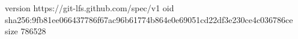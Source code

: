 version https://git-lfs.github.com/spec/v1
oid sha256:9fb81ee066437786f67ac96b61774b864e0e69051cd22df3e230ce4c036786ce
size 786528
